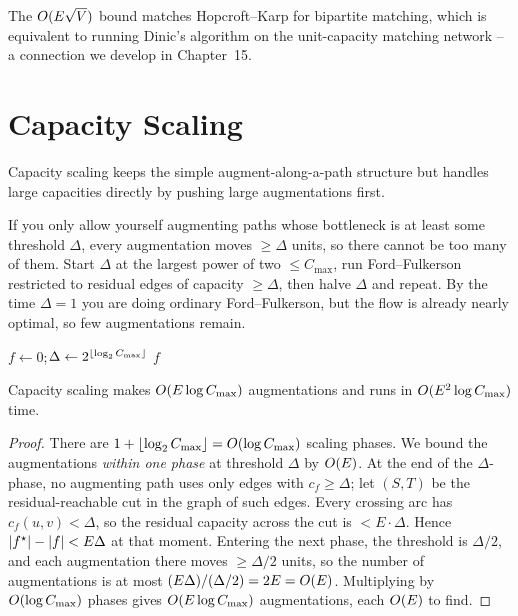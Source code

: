 The $O(E\sqrt V)$ bound matches Hopcroft--Karp for bipartite
matching, which is equivalent to running Dinic's algorithm on the unit-capacity matching network -- a connection we develop
in Chapter~15.

\section{Capacity Scaling}
\label{ch12:scaling}

Capacity scaling keeps the simple
augment-along-a-path structure but handles large capacities directly by pushing large augmentations first.

\begin{intuitionbox}
If you only allow yourself augmenting paths whose bottleneck is at least some
threshold $\Delta$, every augmentation moves $\ge\Delta$ units, so there cannot be
too many of them. Start $\Delta$ at the largest power of two $\le C_{\max}$, run
Ford--Fulkerson restricted to residual edges of capacity $\ge\Delta$, then halve
$\Delta$ and repeat. By the time $\Delta=1$ you are doing ordinary
Ford--Fulkerson, but the flow is already nearly optimal, so few augmentations
remain.
\end{intuitionbox}

\begin{algorithm}[H]
\caption{\textsc{Capacity Scaling}}
\label{ch12:alg-scaling}
$f\gets 0$;\quad $\Delta\gets 2^{\lfloor\log_2 C_{\max}\rfloor}$\;
\Return $f$\;
\end{algorithm}

\begin{theorem}
\label{ch12:thm-scaling}
Capacity scaling makes $O(E\log C_{\max})$ augmentations and runs in
$O(E^2\log C_{\max})$ time.
\end{theorem}

\begin{proof}
There are $1+\lfloor\log_2 C_{\max}\rfloor=O(\log C_{\max})$ scaling phases. We bound
the augmentations \emph{within one phase} at threshold $\Delta$ by $O(E)$. At the
end of the $\Delta$-phase, no augmenting path uses only edges with $c_f\ge\Delta$;
let $(S,T)$ be the residual-reachable cut in the graph of such edges. Every
crossing arc has $c_f(u,v)<\Delta$, so the residual capacity across the cut is
$<E\cdot\Delta$. Hence $\lvert f^\star\rvert-\lvert f\rvert<E\Delta$ at that moment. Entering the
next phase, the threshold is $\Delta/2$, and each augmentation there moves
$\ge\Delta/2$ units, so the number of augmentations is at most
$(E\Delta)/(\Delta/2)=2E=O(E)$. Multiplying by $O(\log C_{\max})$ phases gives
$O(E\log C_{\max})$ augmentations, each $O(E)$ to find.
\end{proof}

